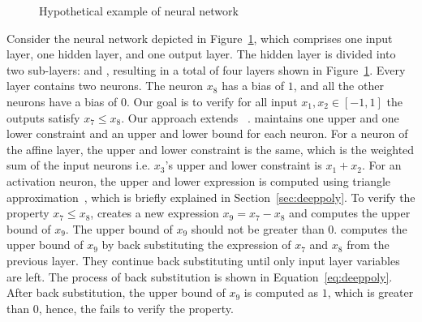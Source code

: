 \begin{figure}[t]
	\centering
	\scalebox{0.8}{}
	\caption{Hypothetical example of neural network}
	\label{fig:motivating}
\end{figure}
Consider the neural network depicted in Figure~\ref{fig:motivating}, which comprises one input layer, one hidden layer, 
and one output layer. The hidden layer is divided into two sub-layers: \affine{} and \relu{}, 
resulting in a total of four layers shown in Figure~\ref{fig:motivating}.
Every layer contains two neurons. The neuron $x_8$ has a bias of $1$, and all the other neurons have a bias of $0$. 
Our goal is to verify for all input $x_1,x_2 \in [-1,1]$ the outputs satisfy $x_7 \leq x_8$. 
Our approach extends \deeppoly{}~\cite{singh2019abstract}.
\deeppoly{} maintains one upper and
one lower constraint and an upper and lower bound for each neuron.
For a neuron of the affine layer, the upper and lower constraint is 
the same, which is the weighted sum of the input neurons i.e. $x_3$'s upper and lower constraint is $x_1+x_2$.
For an activation neuron, the upper and lower expression is computed using triangle approximation~\cite{singh2019abstract}, 
which is briefly explained in Section~\ref{sec:deeppoly}. To verify the property $x_7 \leq x_8$, \deeppoly{} creates a 
new expression $x_9 = x_7 - x_8$ and computes the upper bound of $x_9$. The upper bound of $x_9$ should not be greater
than $0$. \deeppoly{} computes the upper bound of $x_9$ by back substituting the expression of $x_7$ and $x_8$ 
from the previous layer.
They continue back substituting until only input layer variables are left.
The process of back substitution is shown in Equation~\ref{eq:deeppoly}.
After back substitution, the upper bound of $x_9$ is
computed as $1$, which is greater than $0$, 
hence, the \deeppoly{} fails to verify the property.

